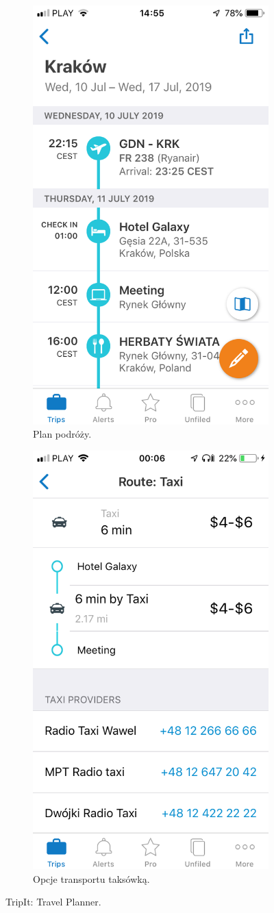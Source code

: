 \documentclass[10pt,twoside,a4paper]{report}
\begin{document}
\begin{figure}[h]
\begin{subfigure}{0.5\textwidth}
\centering
\includegraphics[width=0.9\linewidth, width=5cm]{tripit1}
\caption{Plan podróży.}
\label{fig:TIsubim1}
\end{subfigure}
\begin{subfigure}{0.5\textwidth}
\centering
\includegraphics[width=0.9\linewidth, width=5cm]{tripit2}
\caption{Opcje transportu taksówką.}
\label{fig:TIsubim2}
\end{subfigure}
\caption{TripIt: Travel Planner.}
\label{fig:TIimage1}
\end{figure}
\end{document}
